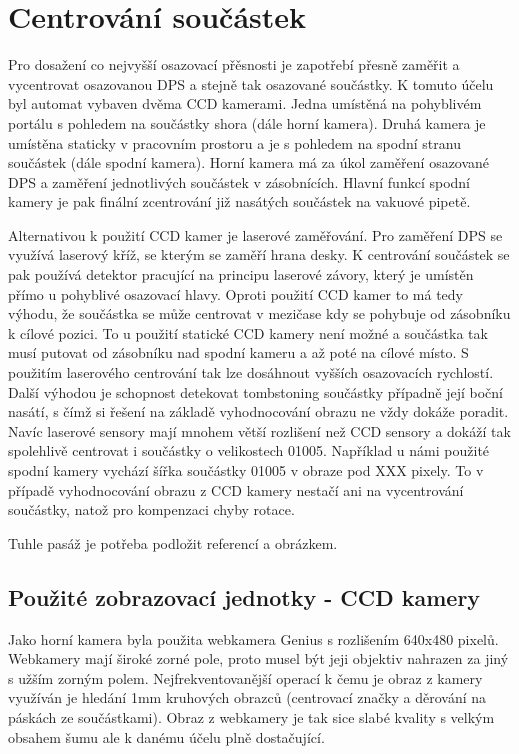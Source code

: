 \chapter{Centrování součástek}

Pro dosažení co nejvyšší osazovací přěsnosti je zapotřebí přesně zaměřit a vycentrovat osazovanou DPS a stejně tak osazované součástky. K tomuto účelu byl automat vybaven dvěma CCD kamerami. Jedna umístěná na pohyblivém portálu s pohledem na součástky shora (dále horní kamera). Druhá kamera je umístěna staticky v pracovním prostoru a je s pohledem na spodní stranu součástek (dále spodní kamera). Horní kamera má za úkol zaměření osazované DPS a zaměření jednotlivých součástek v zásobnících. Hlavní funkcí spodní kamery je pak finální zcentrování již nasátých součástek na vakuové pipetě.  

Alternativou k použití CCD kamer je laserové zaměřování. Pro zaměření DPS se využívá laserový kříž, se kterým se zaměří hrana desky. K centrování součástek se pak používá detektor pracující na principu laserové závory, který je umístěn přímo u pohyblivé osazovací hlavy. Oproti použití CCD kamer to má tedy výhodu, že součástka se může centrovat v mezičase kdy se pohybuje od zásobníku k cílové pozici. To u použití statické CCD kamery není možné a součástka tak musí putovat od zásobníku nad spodní kameru a až poté na cílové místo. S použitím laserového centrování tak lze dosáhnout vyšších osazovacích rychlostí. Další výhodou je schopnost detekovat tombstoning součástky případně její boční nasátí, s čímž si řešení na základě vyhodnocování obrazu ne vždy dokáže poradit. Navíc laserové sensory mají mnohem větší rozlišení než CCD sensory a dokáží tak spolehlivě centrovat i součástky o velikostech 01005. Například u námi použité spodní kamery vychází šířka součástky 01005 v obraze pod XXX pixely. To v případě vyhodnocování obrazu z CCD kamery nestačí ani na vycentrování součástky, natož pro kompenzaci chyby rotace. 

Tuhle pasáž je potřeba podložit referencí a obrázkem.

\section{Použité zobrazovací jednotky - CCD kamery}
Jako horní kamera byla použita webkamera Genius s rozlišením 640x480 pixelů. Webkamery mají široké zorné pole, proto musel být jeji objektiv nahrazen za jiný s užším zorným polem.  Nejfrekventovanější operací k čemu je obraz z kamery využíván je hledání 1mm kruhových obrazců (centrovací značky a děrování na páskách ze součástkami). Obraz z webkamery je tak sice slabé kvality s velkým obsahem šumu ale k danému účelu plně dostačující. 

